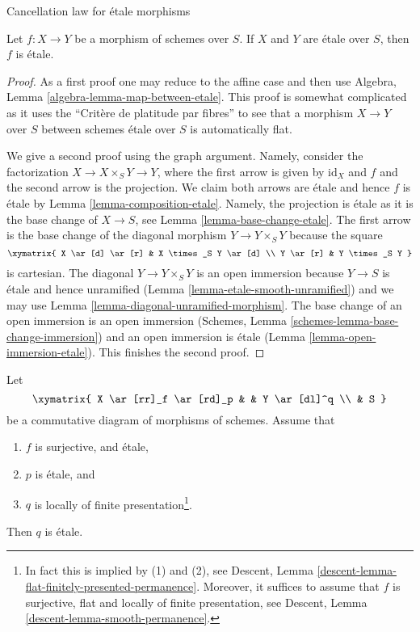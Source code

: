 \begin{lemma}
\label{lemma-etale-permanence}
\begin{slogan}
Cancellation law for \'etale morphisms
\end{slogan}
Let $f : X \to Y$ be a morphism of schemes over $S$.
If $X$ and $Y$ are \'etale over $S$, then
$f$ is \'etale.
\end{lemma}

\begin{proof}
As a first proof one may reduce to the affine case and then use
Algebra, Lemma \ref{algebra-lemma-map-between-etale}. This proof is
somewhat complicated as it uses the ``Crit\`ere de platitude par fibres''
to see that a morphism $X \to Y$ over $S$ between schemes \'etale over $S$
is automatically flat.

\medskip\noindent
We give a second proof using the graph argument. Namely, consider the
factorization $X \to X \times_S Y \to Y$, where the first arrow
is given by $\text{id}_X$ and $f$ and the second arrow is the projection.
We claim both arrows are \'etale and hence $f$ is \'etale by
Lemma \ref{lemma-composition-etale}. Namely, the projection is \'etale
as it is the base change of $X \to S$, see Lemma \ref{lemma-base-change-etale}.
The first arrow is the base change of the diagonal morphism
$Y \to Y \times_S Y$ because the square
$$
\xymatrix{
X \ar[d] \ar[r] & X \times_S Y \ar[d] \\
Y \ar[r] & Y \times_S Y
}
$$
is cartesian. The diagonal $Y \to Y \times_S Y$ is an open immersion
because $Y \to S$ is \'etale and hence unramified
(Lemma \ref{lemma-etale-smooth-unramified}) and we may use
Lemma \ref{lemma-diagonal-unramified-morphism}. The base change
of an open immersion is an open immersion
(Schemes, Lemma \ref{schemes-lemma-base-change-immersion})
and an open immersion is \'etale
(Lemma \ref{lemma-open-immersion-etale}). This finishes the second proof.
\end{proof}

\begin{lemma}
\label{lemma-etale-permanence-two}
Let
$$
\xymatrix{
X \ar[rr]_f \ar[rd]_p & &
Y \ar[dl]^q \\
& S
}
$$
be a commutative diagram of morphisms of schemes. Assume that
\begin{enumerate}
\item $f$ is surjective, and \'etale,
\item $p$ is \'etale, and
\item $q$ is locally of finite presentation\footnote{In fact this
is implied by (1) and (2), see
Descent, Lemma \ref{descent-lemma-flat-finitely-presented-permanence}.
Moreover, it suffices to assume that $f$ is surjective, flat and
locally of finite presentation, see
Descent, Lemma \ref{descent-lemma-smooth-permanence}.}.
\end{enumerate}
Then $q$ is \'etale.
\end{lemma}

